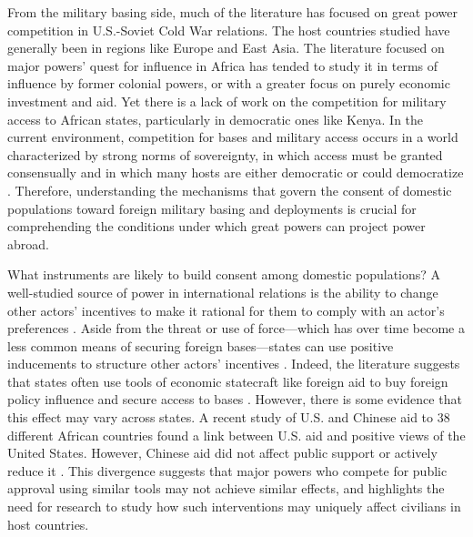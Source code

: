 From the military basing side, much of the literature has focused on great power competition in U.S.-Soviet Cold War relations. The host countries studied have generally been in regions like Europe and East Asia. The literature focused on major powers' quest for influence in Africa has tended to study it in terms of influence by former colonial powers, or with a greater focus on purely economic investment and aid. Yet there is a lack of work on the competition for military access to African states, particularly in democratic ones like Kenya. In the current environment, competition for bases and military access occurs in a world characterized by strong norms of sovereignty, in which access must be granted consensually and in which many hosts are either democratic or could democratize \cite{Cooley2008,schmidt2020}. Therefore, understanding the mechanisms that govern the consent of domestic populations toward foreign military basing and deployments is crucial for comprehending the conditions under which great powers can project power abroad. 

What instruments are likely to build consent among domestic populations? A well-studied source of power in international relations is the ability to change other actors' incentives to make it rational for them to comply with an actor's preferences \cite{dahl1961}. Aside from the threat or use of force—which has over time become a less common means of securing foreign bases—states can use positive inducements to structure other actors' incentives \cite{schmidt2020,Lake1996}. Indeed, the literature suggests that states often use tools of economic statecraft like foreign aid to buy foreign policy influence and secure access to bases \cite{carter2015,alexander2019,blankenship2020,joyce2023}. However, there is some evidence that this effect may vary across states. A recent study of U.S. and Chinese aid to 38 different African countries found a link between U.S. aid and positive views of the United States. However, Chinese aid did not affect public support or actively reduce it \cite{blair2022}. This divergence suggests that major powers who compete for public approval using similar tools may not achieve similar effects, and highlights the need for research to study how such interventions may uniquely affect civilians in host countries.

